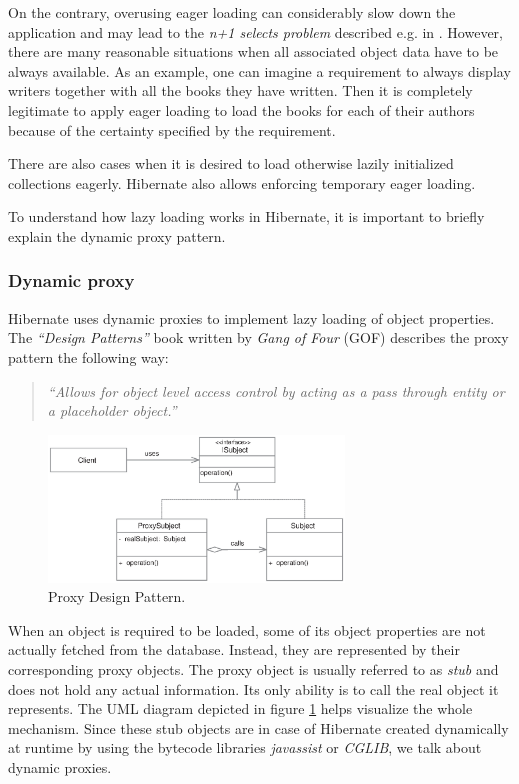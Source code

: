 On the contrary, overusing eager loading can considerably slow down the application and may lead to the \textit{n+1 selects problem} described e.g. in \cite{HibernateInAction:2004}.	
However, there are many reasonable situations when all associated object data have to be always available. 
As an example, one can imagine a requirement to always display writers together with all the books they have written. 
Then it is completely legitimate to apply eager loading to load the books for each of their authors because of the certainty specified by the requirement.

There are also cases when it is desired to load otherwise lazily initialized collections eagerly.
Hibernate also allows enforcing temporary eager loading.

To understand how lazy loading works in Hibernate, it is important to briefly explain the dynamic proxy pattern. 

\subsubsection{Dynamic proxy}

Hibernate uses dynamic proxies to implement lazy loading of object properties. 
The \textit{``Design Patterns''} book written by \textit{Gang of Four} (GOF) \cite{GOF:DesignPatterns} describes the proxy pattern the following way:

\begin{quote}		
\textit{``Allows for object level access control by acting as a pass through entity or a placeholder object.''}
\end{quote}


\begin{figure}[h]
	\centering
		\includegraphics[width=0.7\textwidth]{figures/proxy.eps}
	\caption{Proxy Design Pattern.}
	\label{fig:proxy}
\end{figure}


When an object is required to be loaded, some of its object properties are not actually fetched from the database. Instead, they are represented by their corresponding proxy objects. 
The proxy object is usually referred to as \textit{stub} and does not hold any actual information. 
Its only ability is to call the real object it represents. The UML diagram depicted in figure \ref{fig:proxy} helps visualize the whole mechanism.
Since these stub objects are in case of Hibernate created dynamically at runtime by using the bytecode libraries \textit{javassist} or \textit{CGLIB}, we talk about dynamic proxies. 

